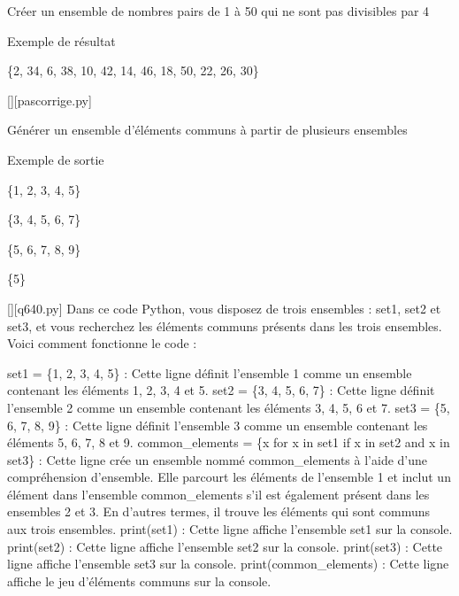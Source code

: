         \question
        Créer un ensemble de nombres pairs de 1 à 50 qui ne sont pas divisibles par 4

Exemple de résultat

\{2, 34, 6, 38, 10, 42, 14, 46, 18, 50, 22, 26, 30\}
        \par
        \begin{solution}
            \renewcommand{\nomfichier}{pascorrige.py}
            \pythonfile{\chemincode \nomfichier}[][\nomfichier]
            
        \end{solution}
        

        \question
        Générer un ensemble d'éléments communs à partir de plusieurs ensembles

Exemple de sortie

\{1, 2, 3, 4, 5\}

\{3, 4, 5, 6, 7\}

\{5, 6, 7, 8, 9\}

\{5\}
        \par
        \begin{solution}
            \renewcommand{\nomfichier}{q640.py}
            \pythonfile{\chemincode \nomfichier}[][\nomfichier]
            Dans ce code Python, vous disposez de trois ensembles : set1, set2 et set3, et vous recherchez les éléments communs présents dans les trois ensembles. Voici comment fonctionne le code :

    set1 = \{1, 2, 3, 4, 5\} : Cette ligne définit l'ensemble 1 comme un ensemble contenant les éléments 1, 2, 3, 4 et 5.
    set2 = \{3, 4, 5, 6, 7\} : Cette ligne définit l'ensemble 2 comme un ensemble contenant les éléments 3, 4, 5, 6 et 7.
    set3 = \{5, 6, 7, 8, 9\} : Cette ligne définit l'ensemble 3 comme un ensemble contenant les éléments 5, 6, 7, 8 et 9.
    common\_elements = \{x for x in set1 if x in set2 and x in set3\} : Cette ligne crée un ensemble nommé common\_elements à l'aide d'une compréhension d'ensemble. Elle parcourt les éléments de l'ensemble 1 et inclut un élément dans l'ensemble common\_elements s'il est également présent dans les ensembles 2 et 3. En d'autres termes, il trouve les éléments qui sont communs aux trois ensembles.
    print(set1) : Cette ligne affiche l'ensemble set1 sur la console.
    print(set2) : Cette ligne affiche l'ensemble set2 sur la console.
    print(set3) : Cette ligne affiche l'ensemble set3 sur la console.
    print(common\_elements) : Cette ligne affiche le jeu d'éléments communs sur la console.
        \end{solution}
        

